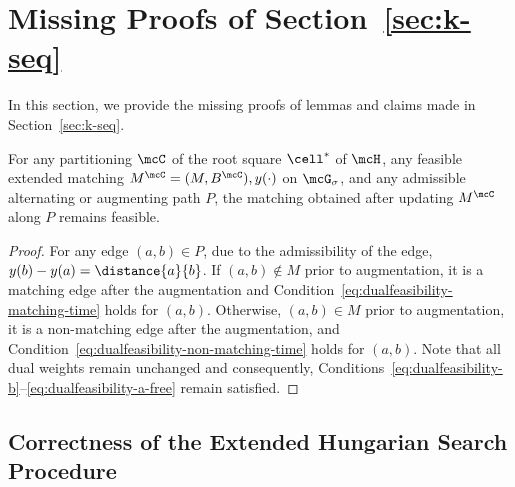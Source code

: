 %
%
%
%
%
%

%
%

%
%
%
%
%

%
%
%
%
%
%
%
%
%
%
%
%
%
%











%
%
%
%
%
%
%
%
%
%
%
%
%
%
%
%



%


%
%
%
%
%
%
%
%
%
%
%
%
%
%
%
%
%





\section{Missing Proofs of Section~\ref{sec:k-seq}}\label{sec:k-seq-appendix}

In this section, we provide the missing proofs of lemmas and claims made in Section~\ref{sec:k-seq}.

\begin{lemma}\label{lemma:augment}
    For any partitioning $\mcC$ of the root square $\cell^*$ of $\mcH$, any feasible extended matching $M^\mcC=(M, B^\mcC), y(\cdot)$ on $\mcG_\sigma$, and any admissible alternating or augmenting path $P$, the matching obtained after updating $M^\mcC$ along $P$ remains feasible.
\end{lemma}
\begin{proof}
    For any edge $(a,b)\in P$, due to the admissibility of the edge, $y(b)-y(a)=\distance{a}{b}$. If $(a,b)\notin M$ prior to augmentation, it is a matching edge after the augmentation and Condition~\eqref{eq:dualfeasibility-matching-time} holds for $(a,b)$. Otherwise, $(a,b)\in M$ prior to augmentation, it is a non-matching edge after the augmentation, and Condition~\eqref{eq:dualfeasibility-non-matching-time} holds for $(a,b)$. Note that all dual weights remain unchanged and consequently, Conditions~\eqref{eq:dualfeasibility-b}--\eqref{eq:dualfeasibility-a-free} remain satisfied.
\end{proof}


%

\subsection{Correctness of the Extended Hungarian Search Procedure}


